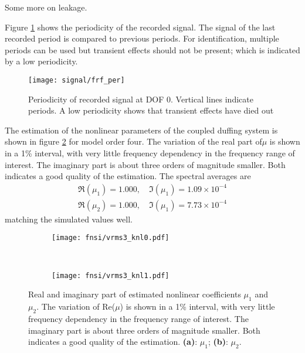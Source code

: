 Some more on leakage.

Figure \ref{fig:periodicity} shows the periodicity of the recorded signal. The
signal of the last recorded period is compared to previous periods. For
identification, multiple periods can be used but transient effects should not be
present; which is indicated by a low periodicity.

\begin{figure}[!ht]
  \centering
  \texttt{[image: signal/frf\_per]}
  \caption{Periodicity of recorded signal at DOF 0. Vertical lines indicate
    periods. A low periodicity shows that transient effects have died out}
  \label{fig:periodicity}
\end{figure}


The estimation of the nonlinear parameters of the coupled duffing system is
shown in figure \ref{fig:fnsi_knl} for model order four. The variation of the
real part of$\mu$ is shown in a 1\% interval, with very little frequency
dependency in the frequency range of interest. The imaginary part is about three
orders of magnitude smaller. Both indicates a good quality of the estimation.
The spectral averages are
\begin{equation}
  \begin{aligned}
    \Re (\mu_1) = 1.000, \quad \Im (\mu_1) = 1.09 \times 10^{-4} \\
    \Re (\mu_2) = 1.000, \quad \Im (\mu_1) = 7.73 \times 10^{-4}
  \end{aligned}
\end{equation}
matching the simulated values well.

\begin{figure}[!ht]
  \centering
  \begin{subfigure}[b]{0.45\textwidth}
    \texttt{[image: fnsi/vrms3\_knl0.pdf]}
    \caption{}
  \end{subfigure}
  ~
  \begin{subfigure}[b]{0.45\textwidth}
    \texttt{[image: fnsi/vrms3\_knl1.pdf]}
    \caption{}
  \end{subfigure}
  \caption{Real and imaginary part of estimated nonlinear coefficients $\mu_1$
    and $\mu_2$. The variation of Re($\mu$) is shown in a 1\% interval, with
    very little frequency dependency in the frequency range of interest.
    The imaginary part is about three orders of magnitude smaller. Both
    indicates a good quality of the estimation.
    \textbf{(a)}: $\mu_1$;
    \textbf{(b)}: $\mu_2$.
  }
  \label{fig:fnsi_knl}
\end{figure}

